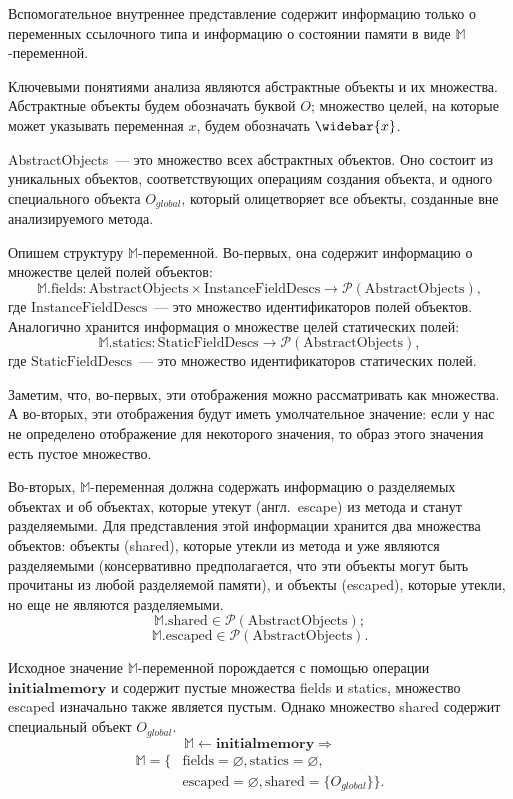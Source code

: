 \documentclass[14pt,titlepage,draft]{extarticle}
\newcommand{\M}{\ensuremath{\mathbb{M}}}
\newcommand{\Mfield}[1]{\textrm{#1}}
\newcommand{\Mhyp}{$\mathbb{M}$\hyp}
\newcommand{\INITIALMEMORY}{\textbf{initialmemory}}
\newcommand{\pts}[1]{\widebar{#1}}
\renewcommand{\emptyset}{\varnothing}
\newcommand{\powerset}[1]{\mathcal{P}(#1)}
\newcommand{\eng}[1]{{\English#1}}
\newcommand{\engdef}[1]{(англ.~\eng{#1})}
\begin{document}
    Вспомогательное внутреннее представление содержит информацию только о
    переменных ссылочного типа и информацию о состоянии памяти в виде
    \Mhyp переменной.

    Ключевыми понятиями анализа являются абстрактные объекты и их множества.
    Абстрактные объекты будем обозначать буквой $O$; множество целей, на
    которые может указывать переменная $x$, будем обозначать $\pts{x}$.

    \textrm{AbstractObjects}~--- это множество всех абстрактных объектов. Оно
    состоит из уникальных объектов, соответствующих операциям создания объекта,
    и одного специального объекта $O_{global}$, который олицетворяет все
    объекты, созданные вне анализируемого метода.

    Опишем структуру \Mhyp переменной. Во-первых, она содержит информацию о
    множестве целей полей объектов:
    \[ \M.\Mfield{fields}\colon
      \textrm{AbstractObjects} \times \textrm{InstanceFieldDescs} \to
      \powerset{\textrm{AbstractObjects}},
    \]
    где $\textrm{InstanceFieldDescs}$~--- это множество идентификаторов полей
    объектов.
    Аналогично хранится информация о множестве целей статических полей:
    \[ \M.\Mfield{statics}\colon
      \textrm{StaticFieldDescs} \to
      \powerset{\textrm{AbstractObjects}},
    \]
    где $\textrm{StaticFieldDescs}$~--- это множество идентификаторов
    статических полей.

    Заметим, что, во-первых, эти отображения можно рассматривать как множества.
    А во-вторых, эти отображения будут иметь умолчательное значение: если у нас
    не определено отображение для некоторого значения, то образ этого значения
    есть пустое множество.

    Во-вторых, \Mhyp переменная должна содержать информацию о разделяемых
    объектах и об объектах, которые утекут \engdef{escape} из метода и станут
    разделяемыми. Для представления этой информации хранится два множества
    объектов: объекты (\eng{shared}), которые утекли из метода и уже являются
    разделяемыми (консервативно предполагается, что эти объекты могут быть
    прочитаны из любой разделяемой памяти), и объекты (\eng{escaped}), которые
    утекли, но еще не являются разделяемыми.
    \[ \M.\Mfield{shared} \in \powerset{\textrm{AbstractObjects}}; \]
    \[ \M.\Mfield{escaped} \in \powerset{\textrm{AbstractObjects}}. \]

    Исходное значение \Mhyp переменной порождается с помощью операции
    $\INITIALMEMORY$ и содержит пустые множества \Mfield{fields} и
    \Mfield{statics}, множество \Mfield{escaped} изначально также является
    пустым. Однако множество \Mfield{shared} содержит специальный объект
    $O_{global}$.
    \[\M \leftarrow \INITIALMEMORY \Rightarrow \]
    \[\begin{split}
      \M = \{ &\Mfield{fields} = \emptyset, \Mfield{statics} = \emptyset, \\
      &\Mfield{escaped} = \emptyset,
      \Mfield{shared} = \{O_{global}\}
    \}.
    \end{split}\]
\end{document}
